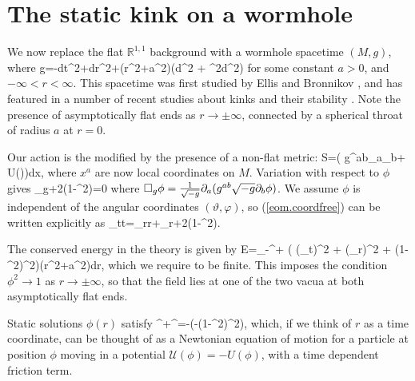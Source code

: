 \section{The static kink on a wormhole}

We now replace the flat $\mathbb{R}^{1,1}$ background with a wormhole spacetime $(M,g)$, where
\be
\nonumber
g=-dt^2+dr^2+(r^2+a^2)(d\vartheta^2 + \sin^2\vartheta d\varphi^2)
\ee
for some constant $a>0$, and $-\infty<r<\infty$. This spacetime was first studied by Ellis \cite{Ellis} and Bronnikov \cite{Bronnikov}, and has featured in a number of recent studies about kinks and their stability \cite{wavemaps,SG}. Note the presence of asymptotically flat ends as $r\rightarrow\pm\infty$, connected by a spherical throat of radius $a$ at $r=0$.

Our action is the modified by the presence of a non-flat metric:
\be
\nonumber
S=\int\bigg( g^{ab}\p_a\phi\p_b\phi + U(\phi)\bigg)dx,
\ee
where $x^a$ are now local coordinates on $M$. Variation with respect to $\phi$ gives
\be
\label{eom.coordfree}
\square_g\phi+2\phi(1-\phi^2)=0
\ee
where $\square_g\phi=\frac{1}{\sqrt{-g}}\partial_a(g^{ab}\sqrt{-g}\partial_b\phi)$. We assume $\phi$ is independent of the angular coordinates $(\vartheta,\varphi)$, so (\ref{eom.coordfree}) can be written explicitly as
\be
\label{eom.coords}
\phi_{tt}=\phi_{rr}+\phi_r+2\phi(1-\phi^2).
\ee

The conserved energy in the theory is given by
\be
\nonumber
E=\int_{-\infty}^{+\infty} \bigg(  (\phi_t)^2 +  (\phi_r)^2 + (1-\phi^2)^2\bigg)(r^2+a^2)dr,
\ee
which we require to be finite. This imposes the condition $\phi^2\rightarrow 1$ as $r\rightarrow\pm\infty$, so that the field lies at one of the two vacua at both asymptotically flat ends.

Static solutions $\phi(r)$ satisfy
\be
\label{eom.static}
\phi^{\prime\prime}+\phi^{\prime}=-\bigg(-(1-\phi^2)^2\bigg),
\ee
which, if we think of $r$ as a time coordinate, can be thought of as a Newtonian equation of motion for a particle at position $\phi$ moving in a potential $\mathcal{U}(\phi)=-U(\phi)$, with a time dependent friction term.


